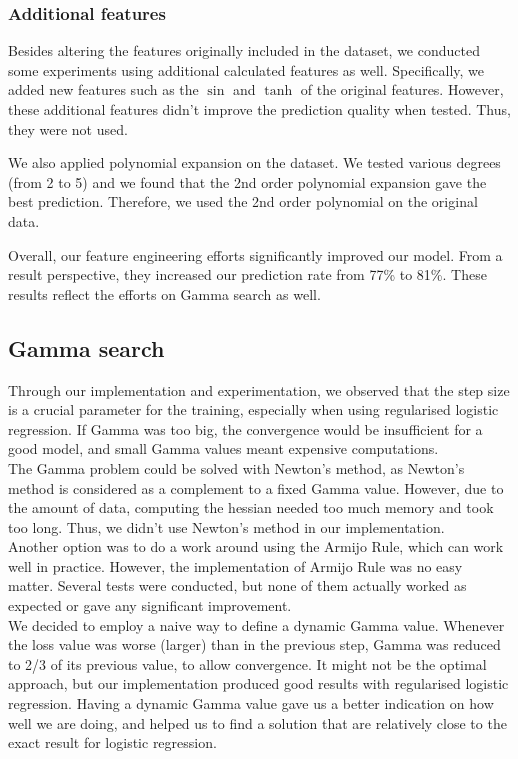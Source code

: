 \documentclass[10pt,conference,compsocconf]{IEEEtran}
\begin{document}
\subsubsection{Additional features}
Besides altering the features originally included in the dataset, we conducted some experiments using additional calculated features as well. Specifically, we added new features such as the $\sin$ and $\tanh$ of the original features. However, these additional features didn't improve the prediction quality when tested. Thus, they were not used.

We also applied polynomial expansion on the dataset. We tested various degrees (from 2 to 5) and we found that the 2nd order polynomial expansion gave the best prediction. Therefore, we used the 2nd order polynomial on the original data.

Overall, our feature engineering efforts significantly improved our model. From a result perspective, they increased our prediction rate from 77\% to 81\%. These results reflect the efforts on Gamma search as well.

\subsection{Gamma search}

Through our implementation and experimentation, we observed that the step size is a crucial parameter for the training, especially when using regularised logistic regression. If Gamma was too big, the convergence would be insufficient for a good model, and small Gamma values meant expensive computations. \\
The Gamma problem could be solved with Newton’s method, as Newton’s method is considered as a complement to a fixed Gamma value. However, due to the amount of data, computing the hessian needed too much memory and took too long. Thus, we didn't use Newton’s method in our implementation. \\
Another option was to do a work around using the Armijo Rule, which can work well in practice. However, the implementation of Armijo Rule was no easy matter. Several tests were conducted, but none of them actually worked as expected or gave any significant improvement. \\
We decided to employ a naive way to define a dynamic Gamma value. Whenever the loss value was worse (larger) than in the previous step, Gamma was reduced to 2/3 of its previous value, to allow convergence. It might not be the optimal approach, but our implementation produced good results with regularised logistic regression.
Having a dynamic Gamma value gave us a better indication on how well we are doing, and helped us to find a solution that are relatively close to the exact result for logistic regression.
\end{document}
